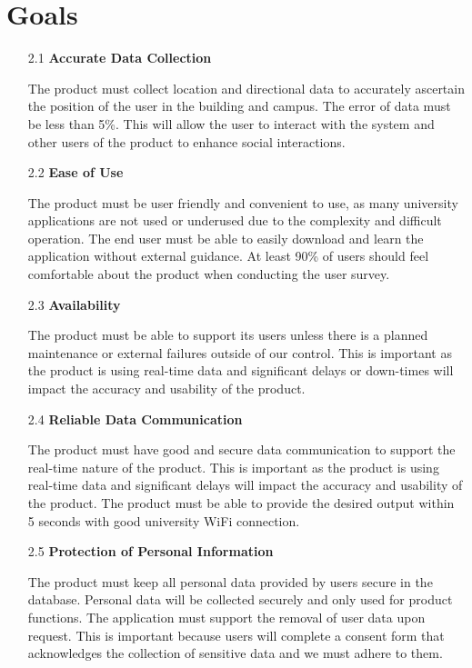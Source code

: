 \documentclass{article}
\begin{document}
\section{Goals}
\begin{itemize}
\item[2.1] \textbf{Accurate Data Collection}

The product must collect location and directional data to accurately ascertain the position of the user in the building and campus. The error of data must be less than 5\%. This will allow the user to interact with the system and other users of the product to enhance social interactions. 

\item[2.2] \textbf{Ease of Use}

The product must be user friendly and convenient to use, as many university applications are not used or underused due to the complexity and difficult operation. The end user must be able to easily download and learn the application without external guidance. At least 90\% of users should feel comfortable about the product when conducting the user survey.

\item[2.3] \textbf{Availability}

The product must be able to support its users unless there is a planned maintenance or external failures outside of our control. This is important as the product is using real-time data and significant delays or down-times will impact the accuracy and usability of the product.

\item[2.4] \textbf{Reliable Data Communication}

The product must have good and secure data communication to support the real-time nature of the product. This is important as the product is using real-time data and significant delays will impact the accuracy and usability of the product. The product must be able to provide the desired output within 5 seconds with good university WiFi connection.

\item[2.5] \textbf{Protection of Personal Information}

The product must keep all personal data provided by users secure in the database. Personal data will be collected securely and only used for product functions. The application must support the removal of user data upon request. This is important because users will complete a consent form that acknowledges the collection of sensitive data and we must adhere to them.


\end{itemize}
\end{document}
